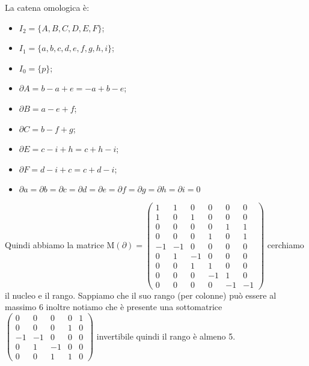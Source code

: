 \documentclass[11pt, a4paper, twoside]{article}
\begin{document}
\begin{sol}
	La catena omologica è:
	\begin{center}
	\end{center}
	\begin{itemize}
		\item $I_2=\{A,B,C,D,E,F\}$;
		\item $I_1=\{a,b,c,d,e,f,g,h,i\}$;
		\item $I_0=\{p\}$;
		\item $\partial A=b-a+e=-a+b-e$;
		\item $\partial B=a-e+f$;
		\item $\partial C =b-f+g$;
		\item $\partial E =c-i+h=c+h-i$;
		\item $\partial F =d-i+c=c+d-i$;
		\item $\partial a=\partial b=\partial c=\partial d=\partial e=\partial f=\partial g=\partial h=\partial i=0$
	\end{itemize}
	Quindi abbiamo la matrice $\text{M}(\partial)=\left(\begin{smallmatrix}1&1&0&0&0&0\\ 1&0&1&0&0&0\\ 0&0&0&0&1&1\\ 0&0&0&1&0&1\\ -1&-1&0&0&0&0\\ 0&1&-1&0&0&0\\ 0&0&1&1&0&0 \\ 0&0&0&-1&1&0\\0&0&0&0&-1&-1\end{smallmatrix}\right)$ cerchiamo il nucleo e il rango. 
	Sappiamo che il suo rango (per colonne) può essere al massimo 6 inoltre notiamo che è presente una sottomatrice $\left(\begin{smallmatrix}0&0&0&0&1\\ 0&0&0&1&0\\-1&-1&0&0&0\\0&1&-1&0&0\\0&0&1&1&0\end{smallmatrix}\right)$ invertibile quindi il rango è almeno 5. 


\end{sol}
\end{document}
